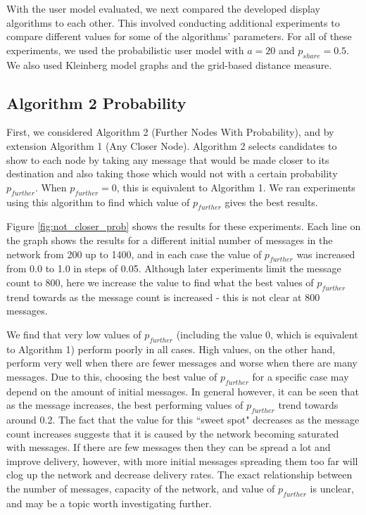 \documentclass[bsc,frontabs,twoside,singlespacing,parskip,deptreport]{infthesis}     %
\begin{document}
With the user model evaluated, we next compared the developed display algorithms to each other. This involved conducting additional experiments to compare different values for some of the algorithms' parameters. For all of these experiments, we used the probabilistic user model with $a = 20$ and $p_{share} = 0.5$. We also used Kleinberg model graphs and the grid-based distance measure.

\subsection{Algorithm 2 Probability} \label{subsec:algorithm_2_prob}
First, we considered Algorithm 2 (Further Nodes With Probability), and by extension Algorithm 1 (Any Closer Node). Algorithm 2 selects candidates to show to each node by taking any message that would be made closer to its destination and also taking those which would not with a certain probability $p_{further}$. When $p_{further}=0$, this is equivalent to Algorithm 1. We ran experiments using this algorithm to find which value of $p_{further}$ gives the best results.

Figure \ref{fig:not_closer_prob} shows the results for these experiments. Each line on the graph shows the results for a different initial number of messages in the network from 200 up to 1400, and in each case the value of $p_{further}$ was increased from 0.0 to 1.0 in steps of 0.05. Although later experiments limit the message count to 800, here we increase the value to find what the best values of $p_{further}$ trend towards as the message count is increased - this is not clear at 800 messages.

We find that very low values of $p_{further}$ (including the value 0, which is equivalent to Algorithm 1) perform poorly in all cases. High values, on the other hand, perform very well when there are fewer messages and worse when there are many messages. Due to this, choosing the best value of $p_{further}$ for a specific case may depend on the amount of initial messages. In general however, it can be seen that as the message increases, the best performing values of $p_{further}$ trend towards around 0.2. The fact that the value for this ``sweet spot" decreases as the message count increases suggests that it is caused by the network becoming saturated with messages. If there are few messages then they can be spread a lot and improve delivery, however, with more initial messages spreading them too far will clog up the network and decrease delivery rates. The exact relationship between the number of messages, capacity of the network, and value of $p_{further}$ is unclear, and may be a topic worth investigating further.
\end{document}
